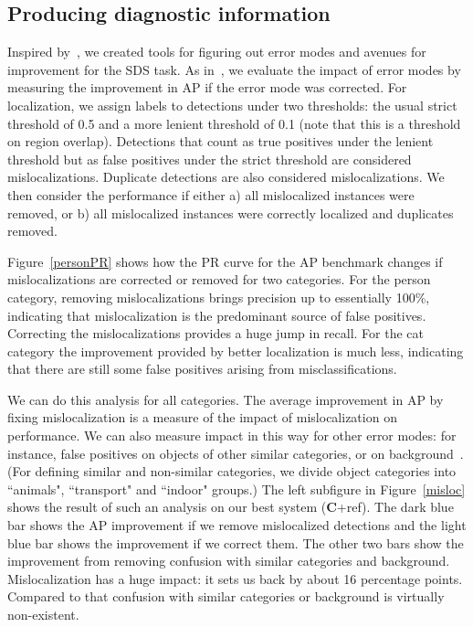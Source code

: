 \documentclass[runningheads]{llncs}
\newcommand\methodC{\textbf{C}}
\begin{document}
\subsection{Producing diagnostic information}
Inspired by~\cite{HoiemECCV12}, we created tools for figuring out error modes and avenues for improvement for the SDS task. As in~\cite{HoiemECCV12}, we evaluate the impact of error modes by measuring the improvement in AP if the error mode was corrected. For localization, we assign labels to detections under two thresholds: the usual strict threshold of 0.5 and a more lenient threshold of 0.1 (note that this is a threshold on region overlap). Detections that count as true positives under the lenient threshold but as false positives under the strict threshold are considered mislocalizations. Duplicate detections are also considered mislocalizations. We then consider the performance if either a) all mislocalized instances were removed, or b) all mislocalized instances were correctly localized and duplicates removed. 

Figure~\ref{personPR} shows how the PR curve for the AP benchmark changes if mislocalizations are corrected or removed for two categories. For the person category, removing mislocalizations brings precision up to essentially 100\%, indicating that mislocalization is the predominant source of false positives. Correcting the mislocalizations provides a huge jump in recall. For the cat category the improvement provided by better localization is much less, indicating that there are still some false positives arising from misclassifications.

We can do this analysis for all categories. The average improvement in AP by fixing mislocalization is a measure of the impact of mislocalization on performance. We can also measure impact in this way for other error modes: for instance, false positives on objects of other similar categories, or on background~\cite{HoiemECCV12}. (For defining similar and non-similar categories, we divide object categories into ``animals", ``transport" and ``indoor" groups.) The left subfigure in Figure~\ref{misloc} shows the result of such an analysis on our best system (\methodC{}+ref). The dark blue bar shows the AP improvement if we remove mislocalized detections and the light blue bar shows the improvement if we correct them. The other two bars show the improvement from removing confusion with similar categories and background. Mislocalization has a huge impact: it sets us back by about 16 percentage points. Compared to that confusion with similar categories or background is virtually non-existent.
\end{document}
